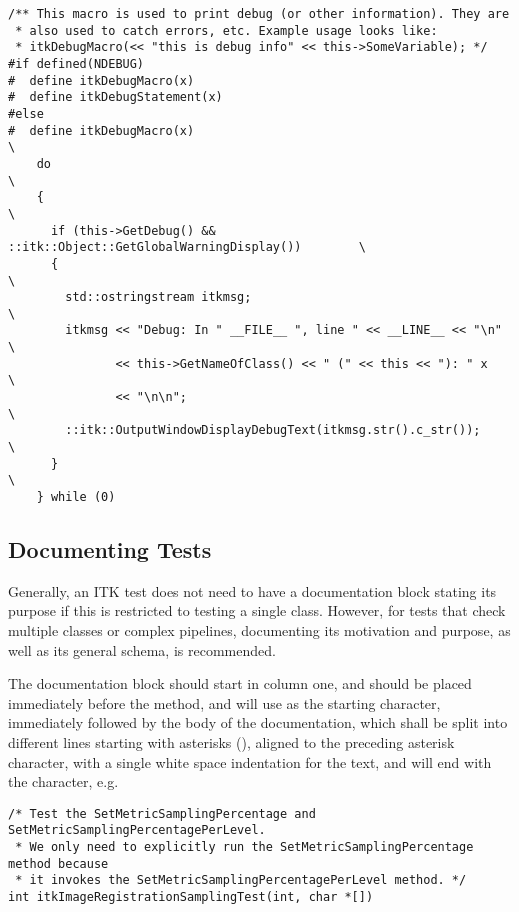 \small
\begin{verbatim}
/** This macro is used to print debug (or other information). They are
 * also used to catch errors, etc. Example usage looks like:
 * itkDebugMacro(<< "this is debug info" << this->SomeVariable); */
#if defined(NDEBUG)
#  define itkDebugMacro(x)
#  define itkDebugStatement(x)
#else
#  define itkDebugMacro(x)                                                     \
    do                                                                         \
    {                                                                          \
      if (this->GetDebug() && ::itk::Object::GetGlobalWarningDisplay())        \
      {                                                                        \
        std::ostringstream itkmsg;                                             \
        itkmsg << "Debug: In " __FILE__ ", line " << __LINE__ << "\n"          \
               << this->GetNameOfClass() << " (" << this << "): " x            \
               << "\n\n";                                                      \
        ::itk::OutputWindowDisplayDebugText(itkmsg.str().c_str());             \
      }                                                                        \
    } while (0)
\end{verbatim}
\normalsize


\subsection{Documenting Tests}
\label{subsec:DocumentingTests}

Generally, an ITK test does not need to have a documentation block stating its
purpose if this is restricted to testing a single class. However, for tests that
check multiple classes or complex pipelines, documenting its motivation and
purpose, as well as its general schema, is recommended.

The documentation block should start in column one, and should be placed
immediately before the  method, and will use \code{/*} as the
starting character, immediately followed by the body of the documentation, which
shall be split into different lines starting with asterisks (\code{*}), aligned
to the preceding asterisk character, with a single white space indentation for
the text, and will end with the \code{*/} character, e.g.

\small
\begin{verbatim}
/* Test the SetMetricSamplingPercentage and SetMetricSamplingPercentagePerLevel.
 * We only need to explicitly run the SetMetricSamplingPercentage method because
 * it invokes the SetMetricSamplingPercentagePerLevel method. */
int itkImageRegistrationSamplingTest(int, char *[])
\end{verbatim}
\normalsize

